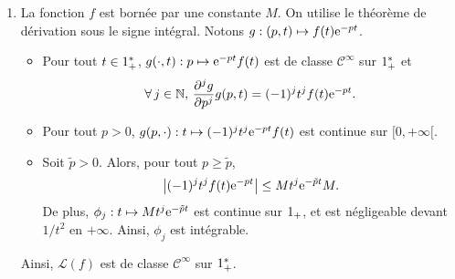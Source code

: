 \begin{preuve}
\begin{enumerate}
\begin{enumerate}
\item $t \mapsto \e^{-pt}$ est intégrable sur $\R_+$ si et seulement si $p > 0$. Alors, $\mathscr{L}(f)(p) = \int_0^{+\infty} \e^{-pt} \d t = \frac{1}{p}$.

\item $t \mapsto \e^{-(\lg-p)t}$ est intégrable sur $\R_+$ si et seulement si $p > \Re{\lg}$. Alors, $\mathscr{L}(f)(p) = \int_0^{+\infty} \e^{-(p-\lg)t} \d t = \frac{1}{p-\lg}$.

\item Soit $n \in \N^*$ et $f_n : t \mapsto t^n \e^{-pt}$.
\begin{itemize}
\item $f_n$ est continue sur $\R_+^*$.
\item Si $p > 0$, alors $f(t) = o_{+\infty}(1/t^2)$ et $f$ est intégrable sur $\R_+^*$.

Si $p \leq 0$, alors $\lim_{+\infty} f = +\infty$ et $f$ n'est pas intégrable sur $\R_+^*$.
\end{itemize}
Ainsi, $f_n$ est intégrable si et seulement si $p > 0$. Une récurrence classique avec des intégrations par parties permet de montrer que
\[
\mathscr{L}(f)(p) = \frac{n!}{p^{n+1}}.
\]

{Remarque.} À un changement de variable près, on retrouve la fonction $\Gamma$ d'Euler.
\end{enumerate}

\item La fonction $f$ est bornée par une constante $M$. On utilise le théorème de dérivation sous le signe intégral. Notons $g : (p, t) \mapsto f(t) \mathrm{e}^{-pt}$.
\begin{itemize}
\item Pour tout $t \in 1_+^*$, $g(\cdot, t) : p \mapsto \mathrm{e}^{-p t} f(t)$ est de classe $\mathscr{C}^\infty$ sur $\R_+^*$ et
\[
\forall\, j \in \mathbb{N},\, \frac{\partial^j g}{\partial p^j} g(p, t) = (-1)^j t^j f(t) \mathrm{e}^{-pt}.
\]

\item Pour tout $p > 0$, $g(p, \cdot) : t \mapsto (-1)^j t^j \mathrm{e}^{-p t} f(t)$ est continue sur $[0,+\infty[$.

\item Soit $\tilde{p} > 0$. Alors, pour tout $p \geq \tilde{p}$,
\[
\abs{(-1)^j t^j f(t) \mathrm{e}^{-p t}} \leq M t^j \mathrm{e}^{- \tilde{p} t} M.
\]
De plus, $\phi_j : t \mapsto M t^j \mathrm{e}^{-\tilde{p} t}$ est continue sur $\R_+$, et est négligeable devant $1/t^2$ en $+\infty$. Ainsi, $\phi_j$ est intégrable.
\end{itemize}
Ainsi, $\mathscr{L}(f)$ est de classe $\mathscr{C}^\infty$ sur $\R_+^*$.


\end{enumerate}
\end{preuve}

